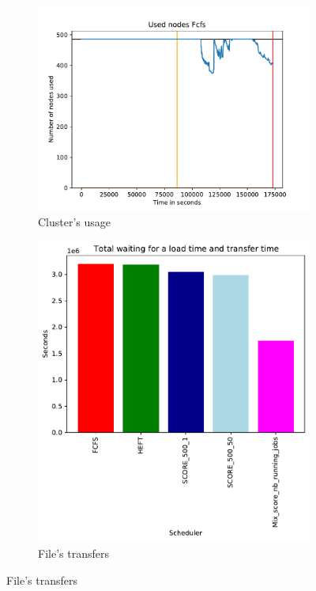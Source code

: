 \documentclass[a4paper]{article}
\begin{document}
\begin{figure}[H]\centering
\begin{subfigure}[b]{0.4\linewidth}\centering\includegraphics[width=1\linewidth]{MBSS/plot/2022-01-21->2022-01-21_V9271_Fcfs_Used_nodes_450_128_32_256_4_1024.pdf}\caption{Cluster's usage}\end{subfigure}
\begin{subfigure}[b]{0.4\linewidth}\centering\includegraphics[width=0.9\linewidth]{MBSS/plot/Results_FCFS_Score_Adaptative_Multiplier_2022-01-21->2022-01-21_V9271_Total_waiting_for_a_load_time_and_transfer_time_450_128_32_256_4_1024.pdf}\caption{File's transfers}\end{subfigure}

\end{figure}
\end{document}
